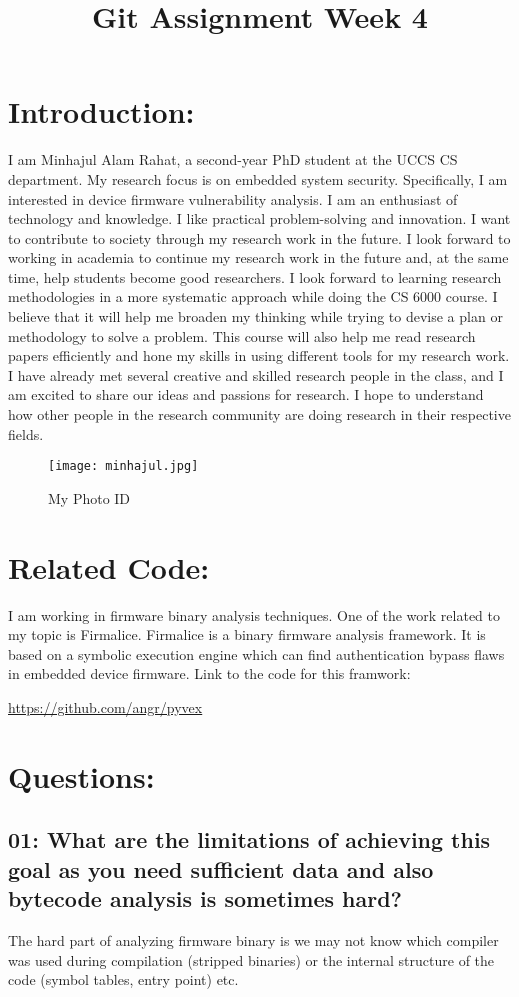 \documentclass{article}
\begin{document}
\title{Git Assignment Week 4 }
\maketitle
\section{Introduction:}

I am Minhajul Alam Rahat, a second-year PhD student at the UCCS CS department. My research focus is on embedded system security. Specifically, I am interested in device firmware vulnerability analysis. I am an enthusiast of technology and knowledge. I like practical problem-solving and innovation. I want to contribute to society through my research work in the future. I look forward to working in academia to continue my research work in the future and, at the same time, help students become good researchers.
I look forward to learning research methodologies in a more systematic approach while doing the CS 6000 course. I believe that it will help me broaden my thinking while trying to devise a plan or methodology to solve a problem. This course will also help me read research papers efficiently and hone my skills in using different tools for my research work. I have already met several creative and skilled research people in the class, and I am excited to share our ideas and passions for research. I hope to understand how other people in the research community are doing research in their respective fields. 

\begin{figure}[h]
    \centering
    \texttt{[image: minhajul.jpg]}
    \caption{My Photo ID}
    \label{fig:personalPic}
\end{figure}

\section{Related Code:}

I am working in firmware binary analysis techniques. One of the work related to my topic is Firmalice. Firmalice is a binary firmware analysis framework. It is based on a symbolic execution engine which can find authentication bypass flaws in embedded device firmware. Link to the code for this framwork: 

\url{https://github.com/angr/pyvex}

\section{Questions:}
\subsection{01: What are the limitations of achieving this goal as you need sufficient data and also bytecode analysis is sometimes hard?}

The hard part of analyzing firmware binary is we may not know which compiler was used during compilation (stripped binaries) or the  internal structure of the code (symbol tables, entry point) etc.  
\end{document}
